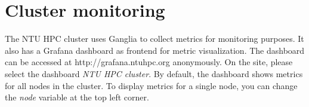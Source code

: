 \section{Cluster monitoring}

The NTU HPC cluster uses Ganglia to collect metrics for monitoring purposes. It also has a Grafana dashboard as frontend for metric visualization. The dashboard can be accessed at http://grafana.ntuhpc.org anonymously. On the site, please select the dashboard \textit{NTU HPC cluster}. By default, the dashboard shows metrics for all nodes in the cluster. To display metrics for a single node, you can change the \textit{node} variable at the top left corner.